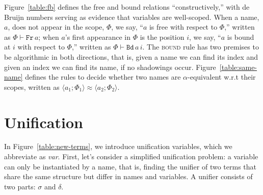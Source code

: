 \documentclass[a4paper,UKenglish]{lipics-v2016}
\newcommand{\clos}[2] {
  \langle #1; #2 \rangle
}
\newcommand{\aeq}[4] {
  \clos{#1}{#2} \approx \clos{#3}{#4}
}
\newcommand*{\transname}[1]{\textsc{#1}}
\begin{document}
Figure~\ref{table:fb} defines the free and bound relations
``constructively,'' with de Bruijn numbers serving as
evidence that variables are well-scoped.  When a name, $a$, does not
appear in the scope, $\Phi$, we say, ``$a$ is free with respect to
$\Phi$,'' written as $\Phi \vdash \texttt{Fr}\, a$; when $a$'s first
appearance in $\Phi$ is the position $i$, we say, ``$a$ is bound at
$i$ with respect to $\Phi$,'' written as $\Phi \vdash \texttt{Bd}\,
a\,i$.  The \transname{bound} rule has two premises to be algorithmic
in both directions, that is, given a name we can find its index and
given an index we can find its name, if no shadowings occur.
Figure~\ref{table:same-name} defines the rules to decide whether two
names are $\alpha$-equivalent w.r.t their scopes, written as
$\aeq{a_1}{\Phi_1}{a_2}{\Phi_2}$.

\section{Unification}
\label{unify}
In Figure~\ref{table:new-terms}, we introduce unification variables,
which we abbreviate as \emph{var}.  First, let's consider a simplified unification
problem: a variable can only be instantiated by a name, that is,
finding the unifier of two terms that share the same structure but
differ in names and variables.  A unifier consists of two parts:
$\sigma$ and $\delta$.
\end{document}
